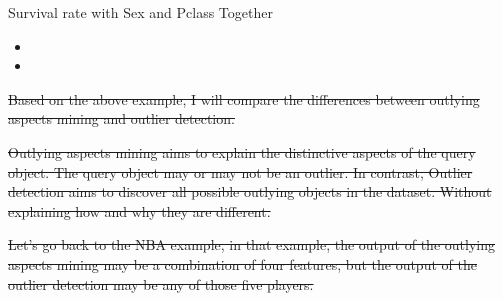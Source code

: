\documentclass[
 size=14pt,
 paper=smartboard,  %
 mode=present, 		%
 display=slides, 	%
 style=tuliplab,  	%
 pauseslide,
 fleqn,leqno]{powerdot}
\providecommand{\DIFdeltex}[1]{{\protect\color{red}\sout{#1}}}                      %
\providecommand{\DIFdelFL}[1]{\DIFdel{#1}} %
\providecommand{\DIFdel}[1]{\texorpdfstring{\DIFdeltex{#1}}{}} %
\begin{document}
\begin{slide}[toc=,bm=]{Survival rate with Sex and Pclass Together}
\begin{table}[tb]
\begin{itemize}
\end{itemize}%
\begin{itemize}%
\item%
\item%

\end{itemize}%

\DIFdelFL{Based on the above example,
I will compare the differences
between outlying aspects mining and outlier detection.
}%

\DIFdelFL{Outlying aspects mining aims to
explain the distinctive aspects of the query object.
The query object may or may not be an outlier.
In contrast,
Outlier detection aims to discover all possible
outlying objects in the dataset.
Without explaining how and why they are different.
}%

\DIFdelFL{Let's go back to the NBA example,
in that example,
the output of the outlying aspects mining may be
a combination of four features,
but the output of the outlier detection may be any of those five players.
}%



\end{table}
\end{slide}
\end{document}
